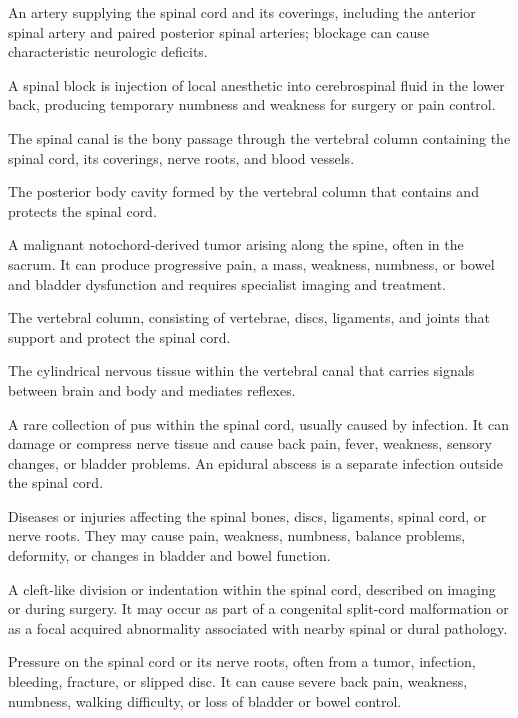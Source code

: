  An artery supplying the spinal cord and its coverings, including the anterior spinal artery and paired posterior spinal arteries; blockage can cause characteristic neurologic deficits.

 A spinal block is injection of local anesthetic into cerebrospinal fluid in the lower back, producing temporary numbness and weakness for surgery or pain control.

 The spinal canal is the bony passage through the vertebral column containing the spinal cord, its coverings, nerve roots, and blood vessels.

 The posterior body cavity formed by the vertebral column that contains and protects the spinal cord.

 A malignant notochord-derived tumor arising along the spine, often in the sacrum. It can produce progressive pain, a mass, weakness, numbness, or bowel and bladder dysfunction and requires specialist imaging and treatment.

 The vertebral column, consisting of vertebrae, discs, ligaments, and joints that support and protect the spinal cord.

 The cylindrical nervous tissue within the vertebral canal that carries signals between brain and body and mediates reflexes.

 A rare collection of pus within the spinal cord, usually caused by infection. It can damage or compress nerve tissue and cause back pain, fever, weakness, sensory changes, or bladder problems. An epidural abscess is a separate infection outside the spinal cord.

 Diseases or injuries affecting the spinal bones, discs, ligaments, spinal cord, or nerve roots. They may cause pain, weakness, numbness, balance problems, deformity, or changes in bladder and bowel function.

 A cleft-like division or indentation within the spinal cord, described on imaging or during surgery. It may occur as part of a congenital split-cord malformation or as a focal acquired abnormality associated with nearby spinal or dural pathology.

 Pressure on the spinal cord or its nerve roots, often from a tumor, infection, bleeding, fracture, or slipped disc. It can cause severe back pain, weakness, numbness, walking difficulty, or loss of bladder or bowel control.

